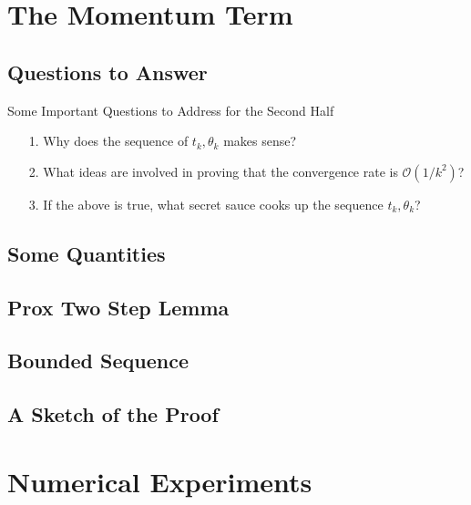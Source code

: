 \documentclass[11pt]{beamer}
\begin{document}
\section{The Momentum Term}
    \subsection{Questions to Answer}
        \begin{frame}{Some Important Questions to Address for the Second Half}
            \begin{itemize}
                \item [1.] Why does the sequence of $t_k, \theta_k$ makes sense?
                \item [2.] What ideas are involved in proving that the convergence rate is $\mathcal O(1/k^2)$? 
                \item [3.] If the above is true, what secret sauce cooks up the sequence $t_k, \theta_k$?
            \end{itemize}
        \end{frame}
        
    \subsection{Some Quantities}
        
    \subsection{Prox Two Step Lemma}
    \subsection{Bounded Sequence}
    \subsection{A Sketch of the Proof}

    
\section{Numerical Experiments}
\end{document}
